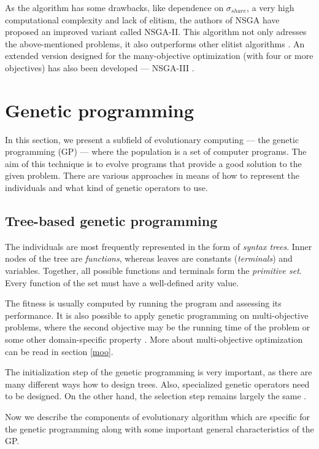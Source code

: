 \label{nsgaii}
As the algorithm has some drawbacks, like dependence on $\sigma_{share}$,
a very high computational complexity and lack of elitism, the authors of
NSGA have proposed an improved variant called NSGA-II. This algorithm not only
adresses the above-mentioned problems, it also outperforms other elitist
algorithms \citep{Deb:2002:FEM:2221359.2221582}. An extended version designed
for the many-objective optimization (with four or more objectives) has also
been developed --- NSGA-III \citep{6600851}.

\section{Genetic programming} \label{sec:gp}
In this section, we present a subfield of evolutionary computing --- 
the genetic programming (GP) --- where the population is a set of computer 
programs. The aim of this technique is to evolve programs that provide 
a good solution to the given problem. There are various approaches in means 
of how to represent the individuals and what kind of genetic operators to 
use.

\subsection{Tree-based genetic programming} \label{gp:treebased}
The individuals are most frequently represented in the form of 
\emph{syntax trees}. Inner nodes of the tree are \emph{functions}, whereas 
leaves  are constants (\emph{terminals}) and variables. Together, all possible
functions and terminals form the \emph{primitive set}. Every function of the
set must have a well-defined arity value.

The fitness is usually computed by running the program and assessing its
performance. It is also possible to apply genetic programming on
multi-objective problems, where the second objective may be the running time
of the problem or some other domain-specific property
\citep[p.~24--26]{Poli:2008:FGG:1796422}. More about multi-objective optimization can be
read in section \ref{moo}.

The initialization step of the genetic programming is very important, as
there are many different ways how to design trees. Also, specialized genetic
operators need to be designed. On the other hand, the selection step remains
largely the same \citep{Poli:2008:FGG:1796422}.

Now we describe the components of evolutionary algorithm which are specific
for the genetic programming along with some important general characteristics
of the GP.

